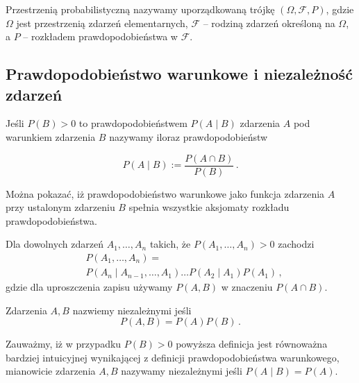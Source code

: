 \documentclass{myclass}
\numberwithin{equation}{section}
\begin{document}
\begin{definition}
Przestrzenią probabilistyczną nazywamy uporządkowaną trójkę \((\Omega, \mathcal{F}, P)\), gdzie
\(\Omega\) jest przestrzenią zdarzeń elementarnych, \(\mathcal{F}\) -- rodziną zdarzeń określoną na
\(\Omega\), a \(P\) -- rozkładem prawdopodobieństwa w \(\mathcal{F}\).
\end{definition}


\subsection{Prawdopodobieństwo warunkowe i niezależność zdarzeń}

\begin{definition}
Jeśli \(P(B) > 0\) to prawdopodobieństwem \(P(A \mid B)\) zdarzenia \(A\) pod warunkiem zdarzenia
\(B\) nazywamy iloraz prawdopodobieństw

\begin{equation*}
    P(A \mid B) := \frac{P(A \cap B)}{ P(B)}\,.
\end{equation*}
\end{definition}

Można pokazać, iż prawdopodobieństwo warunkowe jako funkcja zdarzenia \(A\) przy ustalonym zdarzeniu
\(B\) spełnia wszystkie aksjomaty rozkładu prawdopodobieństwa.

\begin{theorem}
Dla dowolnych zdarzeń \(A_1,\ldots,A_n\) takich, że \(P(A_1,\ldots,A_n) > 0\) zachodzi
\begin{equation*}
    \begin{split}
        &P(A_1,\ldots,A_n) =\\
        &P(A_n \mid A_{n-1},\ldots,A_1) \ldots P(A_2 \mid A_1) P(A_1)\,,
    \end{split}
\end{equation*}
gdzie dla uproszczenia zapisu używamy \(P(A,B)\) w znaczeniu \(P(A \cap B)\).
\end{theorem}

\begin{definition}
Zdarzenia \(A, B\) nazwiemy niezależnymi jeśli
\begin{equation*}
    P(A, B) = P(A) P(B)\,.
\end{equation*}
\end{definition}

Zauważmy, iż w przypadku \(P(B) > 0\) powyższa definicja jest równoważna bardziej intuicyjnej
wynikającej z definicji prawdopodobieństwa warunkowego, mianowicie zdarzenia \(A,B\) nazywamy
niezależnymi jeśli \(P(A \mid B) = P(A)\).
\end{document}
